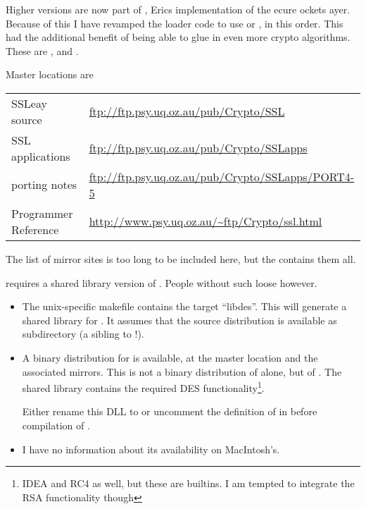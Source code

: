 \documentclass {report}
\begin{document}
Higher versions are now part of \SSLeay, Erics implementation of
the ecure ockets ayer. Because of this I
have revamped the  loader code to use  or
, in this order. This had the additional benefit of
being able to glue in even more crypto algorithms. These are
,  and .


Master locations are\vspace {1em}

{\small \begin {tabular} {|l|l|}\hline
 SSLeay source       	& \url {ftp://ftp.psy.uq.oz.au/pub/Crypto/SSL}       		\\
 SSL applications	& \url {ftp://ftp.psy.uq.oz.au/pub/Crypto/SSLapps}   		\\
 porting notes		& \url {ftp://ftp.psy.uq.oz.au/pub/Crypto/SSLapps/PORT4-5}	\\
 Programmer Reference	& \url {http://www.psy.uq.oz.au/~ftp/Crypto/ssl.html}		\\ \hline
\end {tabular}}\vspace {1em}

The list of mirror sites is too long to be included here, but the
\ssleayfaq{} contains them all.


\trf{} requires a shared library version of . People
without such  loose however.

\begin {itemize}
\item	The unix-specific makefile contains the target ``libdes''. This
	will generate a shared library for . It assumes that the
	 source distribution is available as subdirectory
	 (a sibling to  !).

\item	A binary distribution for \win{} is available, at the master
	location and the associated mirrors. This is not a binary
	distribution of  alone, but of . The
	shared library  contains the required DES
	functionality\footnote {IDEA and RC4 as well, but these are
	\trf {} builtins. I am tempted to integrate the RSA
	functionality though}.

	Either rename this DLL to  or uncomment the
	definition of  in  before
	compilation of \trf {}.

\item	I have no information about its availability on MacIntosh's.
\end   {itemize}
\end{document}
